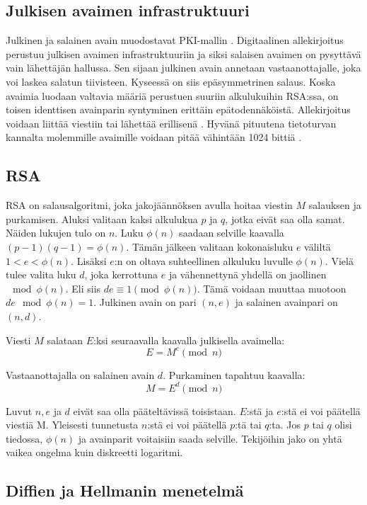 \documentclass[finnish]{tktltiki2}
\theoremstyle{definition}
\theoremstyle{remark}
\begin{document}
\subsection{Julkisen avaimen infrastruktuuri}

Julkinen ja salainen avain muodostavat PKI-mallin \cite{ECC}. Digitaalinen allekirjoitus perustuu julkisen avaimen infrastruktuuriin ja siksi salaisen avaimen on pysyttävä vain lähettäjän hallussa. Sen sijaan julkinen avain annetaan vastaanottajalle, joka voi laskea salatun tiivisteen. Kyseessä on siis epäsymmetrinen salaus. Koska avaimia luodaan valtavia määriä perustuen suuriin alkulukuihin RSA:ssa, on toisen identtisen avainparin syntyminen erittäin epätodennäköistä. Allekirjoitus voidaan liittää viestiin tai lähettää erillisenä \cite{moen}. Hyvänä pituutena tietoturvan kannalta molemmille avaimille voidaan pitää vähintään 1024 bittiä \cite{ECC}. 

\subsection{RSA}

RSA on salausalgoritmi, joka jakojäännöksen avulla hoitaa viestin $M$ salauksen ja purkamisen. Aluksi valitaan kaksi alkulukua $p$ ja $q$, jotka eivät saa olla samat. Näiden lukujen tulo on $n$. Luku $\phi(n)$ saadaan selville kaavalla $(p-1)(q-1) = \phi(n)$. Tämän jälkeen valitaan kokonaisluku $e$ väliltä $1 < e < \phi(n)$. Lisäksi $e$:n on oltava suhteellinen alkuluku luvulle $\phi(n)$. Vielä tulee valita luku $d$, joka kerrottuna $e$ ja vähennettynä yhdellä on jaollinen$\mod{\phi(n)}$. Eli siis $d e \equiv 1\pmod{\phi(n)}$. Tämä voidaan muuttaa muotoon $de \mod{\phi(n)} = 1$. Julkinen avain on pari $(n, e)$ ja salainen avainpari on $(n, d)$.   

Viesti $M$ salataan $E$:ksi seuraavalla kaavalla julkisella avaimella: $$E = M^e \pmod{n}$$

Vastaanottajalla on salainen avain $d$. Purkaminen tapahtuu kaavalla: 
$$ M = E^d \pmod{n} $$

Luvut $n, e$ ja $d$ eivät saa olla pääteltävissä toisistaan. $E$:stä ja $e$:stä ei voi päätellä viestiä M. Yleisesti tunnetusta $n$:stä ei voi päätellä $p$:tä tai $q$:ta. Jos $p$ tai $q$ olisi tiedossa, $\phi(n)$ ja avainparit voitaisiin saada selville. Tekijöihin jako on yhtä vaikea ongelma kuin diskreetti logaritmi. \cite{math1}


\subsection{Diffien ja Hellmanin menetelmä}
\end{document}
